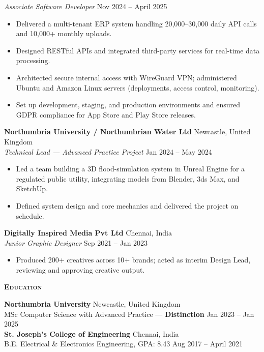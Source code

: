 \documentclass[a4paper,10pt]{article}
\newcommand{\header}[1]{%
    \vspace*{6pt}%
    {\color{accent}\textbf{\scshape #1}}\hspace{4pt}%
    {\color{accent}\hrulefill}\par\vspace*{2pt}%
}
\begin{document}
\textit{Associate Software Developer} \hfill Nov 2024 -- April 2025
\begin{itemize}
    \item Delivered a multi-tenant ERP system handling 20{,}000--30{,}000 daily API calls and 10{,}000+ monthly uploads.
    \item Designed RESTful APIs and integrated third-party services for real-time data processing.
    \item Architected secure internal access with WireGuard VPN; administered Ubuntu and Amazon Linux servers (deployments, access control, monitoring).
    \item Set up development, staging, and production environments and ensured GDPR compliance for App Store and Play Store releases.
\end{itemize}

\textbf{Northumbria University / Northumbrian Water Ltd} \hfill Newcastle, United Kingdom\\
\textit{Technical Lead --- Advanced Practice Project} \hfill Jan 2024 -- May 2024
\begin{itemize}
    \item Led a team building a 3D flood-simulation system in Unreal Engine for a regulated public utility, integrating models from Blender, 3ds Max, and SketchUp.
    \item Defined system design and core mechanics and delivered the project on schedule.
\end{itemize}

\textbf{Digitally Inspired Media Pvt Ltd} \hfill Chennai, India\\
\textit{Junior Graphic Designer} \hfill Sep 2021 -- Jan 2023
\begin{itemize}
    \item Produced 200+ creatives across 10+ brands; acted as interim Design Lead, reviewing and approving creative output.
\end{itemize}

\header{Education}
\textbf{Northumbria University} \hfill Newcastle, United Kingdom\\
MSc Computer Science with Advanced Practice --- \textbf{Distinction} \hfill Jan 2023 -- Jan 2025\\[3pt]
\textbf{St. Joseph's College of Engineering} \hfill Chennai, India\\
B.E. Electrical \& Electronics Engineering, GPA: 8.43 \hfill Aug 2017 -- April 2021
\end{document}
